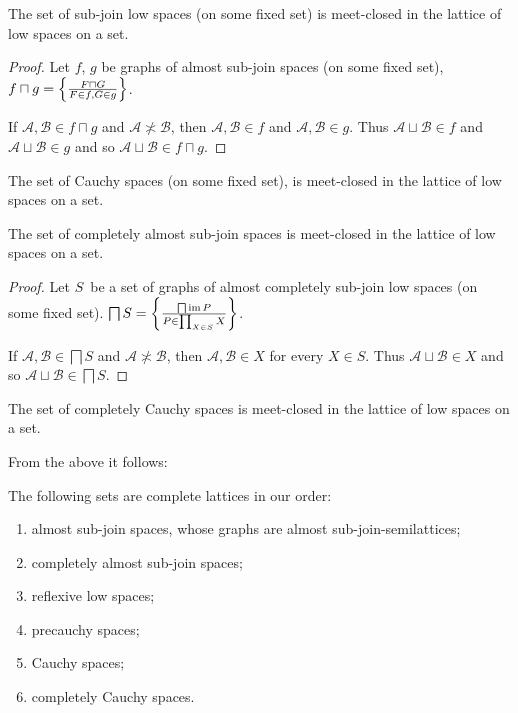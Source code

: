 \begin{prop}
The set of sub-join low spaces (on some fixed set) is meet-closed in the lattice of low spaces on a set.
\end{prop}

\begin{proof}
Let $f$, $g$ be graphs of almost sub-join spaces (on some fixed set), $f\sqcap g = \left\{ \frac{F\sqcap G}{F\in f,G\in g}\right\}$.

If $\mathcal{A}, \mathcal{B} \in f\sqcap g$ and $\mathcal{A}
\nasymp \mathcal{B}$, then $\mathcal{A}, \mathcal{B} \in f$ and $\mathcal{A}, \mathcal{B} \in g$.
Thus $\mathcal{A}\sqcup\mathcal{B}\in f$ and $\mathcal{A}\sqcup\mathcal{B}\in g$ and so
$\mathcal{A} \sqcup \mathcal{B} \in f\sqcap g$.
\end{proof}

\begin{cor}
The set of Cauchy spaces (on some fixed set), is meet-closed in the lattice of low spaces on a set.
\end{cor}

\begin{prop}
The set of completely almost sub-join spaces is meet-closed in the lattice of low spaces on a set.
\end{prop}

\begin{proof}
Let $S$~be a set of graphs of almost completely sub-join low spaces (on some fixed set). $ \bigsqcap S = \left\{ \frac{ \bigsqcap
\operatorname{im} P }{ P \in \prod_{X \in S}  X}\right\}$.

If $\mathcal{A}, \mathcal{B} \in  \bigsqcap S$ and $\mathcal{A}
\nasymp \mathcal{B}$, then $\mathcal{A}, \mathcal{B} \in  X$ for
every $X \in S$. Thus $\mathcal{A} \sqcup \mathcal{B} \in  X$ and so
$\mathcal{A} \sqcup \mathcal{B} \in  \bigsqcap S$.
\end{proof}

\begin{cor}
The set of completely Cauchy spaces is meet-closed in the lattice of low spaces on a set.
\end{cor}

From the above it follows:

\begin{obvious}
The following sets are complete lattices in our order:
\begin{enumerate}
\item almost sub-join spaces, whose graphs are almost sub-join-semilattices;
\item completely almost sub-join spaces;
\item reflexive low spaces;
\item precauchy spaces;
\item Cauchy spaces;
\item completely Cauchy spaces.
\end{enumerate}
\end{obvious}


